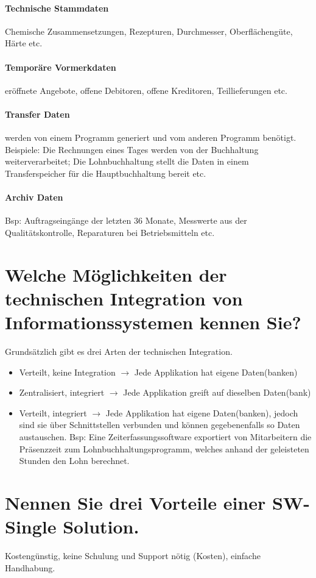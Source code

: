 \paragraph{Technische Stammdaten} Chemische Zusammensetzungen, Rezepturen, Durchmesser, Oberflächengüte, Härte etc.
\paragraph{Temporäre Vormerkdaten} eröffnete Angebote, offene Debitoren, offene Kreditoren, Teillieferungen etc.
\paragraph{Transfer Daten} werden von einem Programm generiert und vom anderen Programm benötigt. Beispiele: Die Rechnungen eines Tages werden von der Buchhaltung weiterverarbeitet; Die Lohnbuchhaltung stellt die Daten in einem Transferspeicher für die Hauptbuchhaltung bereit etc.
\paragraph{Archiv Daten} Bsp: Auftragseingänge der letzten 36 Monate, Messwerte aus der Qualitätskontrolle, Reparaturen bei Betriebsmitteln etc.

\section{Welche Möglichkeiten der technischen Integration von Informationssystemen kennen Sie?}
Grundsätzlich gibt es drei Arten der technischen Integration.
\begin{itemize}
    \item Verteilt, keine Integration $\rightarrow$ Jede Applikation hat eigene Daten(banken)
    \item Zentralisiert, integriert $\rightarrow$ Jede Applikation greift auf dieselben Daten(bank)
    \item Verteilt, integriert $\rightarrow$ Jede Applikation hat eigene Daten(banken), jedoch sind sie über Schnittstellen verbunden und können gegebenenfalls so Daten austauschen. Bsp: Eine Zeiterfassungssoftware exportiert von Mitarbeitern die Präsenzzeit zum Lohnbuchhaltungsprogramm, welches anhand der geleisteten Stunden den Lohn berechnet.
\end{itemize}

\section{Nennen Sie drei Vorteile einer SW-Single Solution.}
Kostengünstig, keine Schulung und Support nötig (Kosten), einfache Handhabung.

